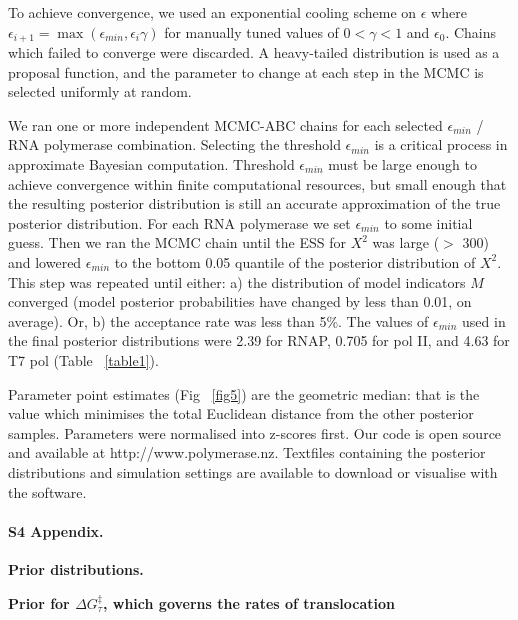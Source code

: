 \documentclass[10pt,letterpaper]{article}
\begin{document}
To achieve convergence, we used an exponential cooling scheme on $\epsilon$ \cite{ratmann2007using} where $\epsilon_{i+1} = \max(\epsilon_{min}, \epsilon_{i}\gamma)$ for manually tuned values of $0 < \gamma < 1$ and $\epsilon_0$. Chains which failed to converge were discarded. A heavy-tailed distribution \cite{brewer2016dnest4} is used as a proposal function, and the parameter to change at each step in the MCMC is selected uniformly at random.


We ran one or more independent MCMC-ABC chains for each selected $\epsilon_{min}$ / RNA polymerase combination.
Selecting the threshold $\epsilon_{min}$ is a critical process in approximate Bayesian computation. Threshold $\epsilon_{min}$ must be large enough to achieve convergence within finite computational resources, but small enough that the resulting posterior distribution is still an accurate approximation of the true posterior distribution. For each RNA polymerase we set $\epsilon_{min}$ to some initial guess. Then we ran the MCMC chain until the ESS for $X^2$ was large ($>$ 300) and lowered $\epsilon_{min}$ to the bottom 0.05 quantile of the posterior distribution of $X^2$. This step was repeated until either: a) the distribution of model indicators $M$ converged (model posterior probabilities have changed by less than 0.01, on average). Or, b) the acceptance rate was less than 5\%. The values of $\epsilon_{min}$ used in the final posterior distributions were 2.39 for RNAP, 0.705 for pol II, and 4.63 for T7 pol (Table ~\ref{table1}).




Parameter point estimates (Fig ~\ref{fig5}) are the geometric median: that is the value which minimises the total Euclidean distance from the other posterior samples. Parameters were normalised into z-scores first. Our code is open source and available at http://www.polymerase.nz. Textfiles containing the posterior distributions and simulation settings are available to download or visualise with the software.








\paragraph*{S4 Appendix.}
\label{S4_Appendix}
\textbf{ Prior distributions.}

\textbf{Prior for $\Delta G^\ddag_{\tau}$, which governs the rates of translocation} \par
\end{document}
